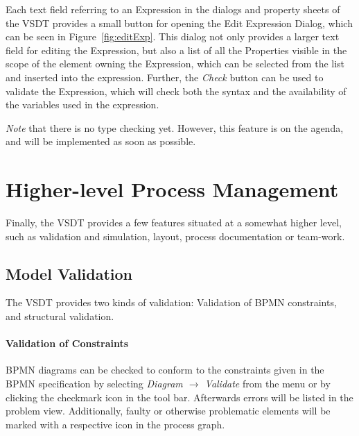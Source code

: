 Each text field referring to an Expression in the dialogs and property sheets of
the VSDT provides a small button for opening the Edit Expression Dialog, which
can be seen in Figure~\ref{fig:editExp}.  This dialog not only provides a larger
text field for editing the Expression, but also a list of all the Properties visible
in the scope of the element owning the Expression, which can be selected from the
list and inserted into the expression.  Further, the \emph{Check} button can be
used to validate the Expression, which will check both the syntax and the
availability of the variables used in the expression.

\emph{Note} that there is no type checking yet.  However, this feature is on the
agenda, and will be implemented as soon as possible.




\section{Higher-level Process Management}

Finally, the VSDT provides a few features situated at a somewhat higher level,
such as validation and simulation, layout, process documentation or team-work.



\subsection{Model Validation}

The VSDT provides two kinds of validation: Validation of BPMN constraints, and
structural validation.

\paragraph{Validation of Constraints}
BPMN diagrams can be checked to conform to the constraints given in the BPMN
specification by selecting \emph{Diagram $\rightarrow$ Validate} from the menu or
by clicking the checkmark icon in the tool bar.  Afterwards errors will be listed
in the problem view.  Additionally, faulty or otherwise problematic elements will
be marked with a respective icon in the process graph.


